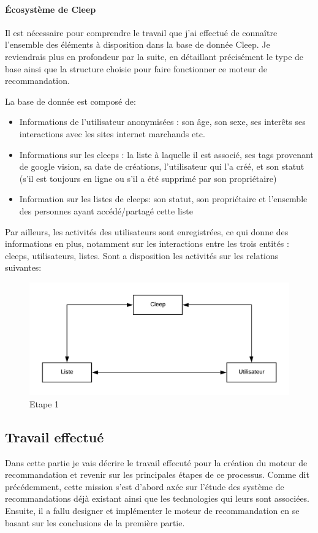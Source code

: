 \documentclass{article} %
\begin{document}
\paragraph{Écosystème de Cleep\\}
Il est nécessaire pour comprendre le travail que j'ai effectué de connaître l'ensemble des éléments à disposition dans la base de donnée Cleep. Je reviendrais plus en profondeur par la suite, en détaillant précisément le type de base ainsi que la structure choisie pour faire fonctionner ce moteur de recommandation.\\
\newpage

La base de donnée est composé de:
\begin{itemize}
	\item Informations de l'utilisateur anonymisées : son âge, son sexe, ses interêts ses interactions avec les sites internet marchands etc.
	\item Informations sur les cleeps : la liste à laquelle il est associé, ses tags provenant de google vision, sa date de créations, l'utilisateur qui l'a créé, et son statut (s'il est toujours en ligne ou s'il a été supprimé par son propriétaire)
	\item Information sur les listes de cleeps: son statut, son propriétaire et l'ensemble des personnes ayant accédé/partagé cette liste
\end{itemize}
Par ailleurs, les activités des utilisateurs sont enregistrées, ce qui donne des informations en plus, notamment sur les interactions entre les trois entités : cleeps, utilisateurs, listes. Sont a disposition les activités sur les relations suivantes:
\begin{figure}[!h]
	\centering
	\includegraphics[keepaspectratio = true,scale=1]{relations.png}
	\caption{Etape 1}
	\label{fig:rel}
\end{figure}



\subsection{Travail effectué}
Dans cette partie je vais décrire le travail effecuté pour la création du moteur de recommandation et revenir sur les principales étapes de ce processus. Comme dit précédemment, cette mission s'est d'abord axée sur l'étude des système de recommandations déjà existant ainsi que les technologies qui leurs sont associées. Ensuite, il a fallu designer et implémenter le moteur de recommandation en se basant sur les conclusions de la première partie. 
\end{document}
